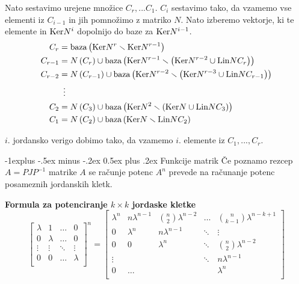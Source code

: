 \documentclass[a4paper,landscape]{article}
\makeatletter
\renewcommand{\subsection}{\@startsection{subsection}{2}{0mm}%
                                {-1explus -.5ex minus -.2ex}%
                                {0.5ex plus .2ex}%
                                {\normalfont\normalsize\bfseries}}
\makeatother
\begin{document}
\begin{multicols}{3}
Nato sestavimo urejene množice $C_r, ... C_1$. $C_i$ sestavimo tako, da vzamemo vse elementi iz $C_{i-1}$ in jih pomnožimo z matriko $N$. Nato izberemo vektorje, ki te elemente in $\textmd{Ker}N^i$ dopolnijo do baze za $\textmd{Ker}N^{i-1}$.
\begin{equation*}
    \begin{aligned}
        C_r &= \textmd{baza}\left( \textmd{Ker}N^{r} \smallsetminus \textmd{Ker}N^{r-1}\right) \\
        C_{r-1} &= N\left( C_{r}\right) \cup \textmd{baza} \left( \textmd{Ker}N^{r-1} \smallsetminus \left( \textmd{Ker}N^{r-2} \cup \textmd{Lin} N C_r \right) \right) \\
        C_{r-2} &= N\left( C_{r-1}\right) \cup \textmd{baza}\left( \textmd{Ker}N^{r-2} \smallsetminus \left( \textmd{Ker}N^{r-3} \cup \textmd{Lin}NC_{r-1} \right) \right) \\
        & \, \ \vdots \\
        C_{2} &= N\left( C_{3}\right) \cup \textmd{baza}\left( \textmd{Ker}N^{2} \smallsetminus \left( \textmd{Ker}N \cup \textmd{Lin}NC_{3} \right) \right) \\
        C_{1} &= N\left( C_{2}\right) \cup \textmd{baza}\left( \textmd{Ker}N \smallsetminus \textmd{Lin} NC_{2} \right) \\
    \end{aligned}
\end{equation*}

$i$. jordansko verigo dobimo tako, da vzamemo $i$. elemente iz $C_1, ..., C_r$.


\subsection{Funkcije matrik}
Če poznamo rezcep $A = PJP^{-1}$ matrike $A$ se računje potenc $A^n$ prevede na računanje potenc posameznih jordanskih kletk.

\textbf{Formula za potenciranje $k \times k$ jordaske kletke}
\[
    \begin{bmatrix}
        \lambda & 1   & \dots & 0 \\
        0 & \lambda & \dots & 0 \\
        \vdots & \vdots & \ddots & \vdots \\
        0 & 0 & \dots & \lambda \\

    \end{bmatrix}^n
    =
    \begin{bmatrix}
        \lambda^n & n\lambda^{n-1} & \binom{n}{2}\lambda^{n-2} & \dots & \binom{n}{k-1}\lambda^{n-k+1} \\
        0 & \lambda^n & n\lambda^{n-1} & \ddots & \vdots \\
        0 & 0 & \lambda^n  & \ddots & \binom{n}{2}\lambda^{n-2} \\
        \vdots &  &  & \ddots & n\lambda^{n-1} \\
        0 & \dots &  &  & \lambda^n \\
    \end{bmatrix}
\]


\end{multicols}
\end{document}
